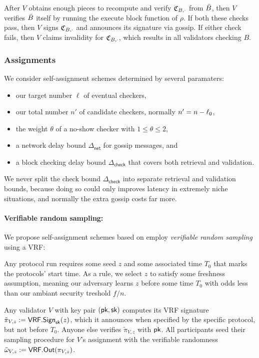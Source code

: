 After $V$ obtains enough pieces to recompute and verify $\mathfrak{C}_{B,\cdot}$ from $\bar{B}$, then $V$ verifies $\bar{B}$ itself by running the execute block function of $\rho$.  If both these checks pass, then $V$ signs $\mathfrak{C}_{B,\cdot}$ and announces its signature via gossip.  If either check fails, then $V$ claims invalidity for $\mathfrak{C}_{B,\cdot}$, which results in all validators checking $B$.

\subsubsection{Assignments}

\newcommand\netdelay{\ensuremath{\Delta_{\mathsf{net}}}}
\newcommand\checkdelay{\ensuremath{\Delta_{\mathsf{check}}}}

We consider self-assignment schemes determined by several paramaters:
\begin{itemize}
\item our target number $\ell$ of eventual checkers,
\item our total number $n'$ of candidate checkers, normally $n' = n - \ell_0$,
\item the weight $\theta$ of a no-show checker with $1 \leq \theta \leq 2$,
\item a network delay bound $\netdelay$ for gossip messages, and
\item a block checking delay bound $\checkdelay$ that covers both retrieval and validation.
\end{itemize}
We never split the check bound $\checkdelay$ into separate retrieval and validation bounds, because doing so could only improves latency in extremely niche situations, and normally the extra gossip costs far more. 

\paragraph{Verifiable random sampling:}

We propose self-assignment schemes based on employ {\em verifiable random sampling} using a VRF:  

Any protocol run requires some seed $z$ and some associated time $T_0$ that marks the protocols' start time.  As a rule, we select $z$ to satisfy some freshness assumption, meaning our adversary learns $z$ before some time $T_0$ with odds less than our ambiant security treshold $f/n$.

Any validator $V$ with key pair $(\mathsf{pk},\mathsf{sk})$ computes its VRF signature $\tilde{\pi}_{V,z} := \mathsf{VRF}.\mathsf{Sign}_{\mathsf{sk}}(z)$, which it announces when specified by the specific protocol, but not before $T_0$.  Anyone else verifies $\tilde{\pi}_{V,z}$ with $\mathsf{pk}$.  All participants seed their sampling procedure for $V$'s assignment with the verifiable randomness $\tilde{\omega}_{V,z} := \mathsf{VRF}.\mathsf{Out}(\pi_{V,z})$.

